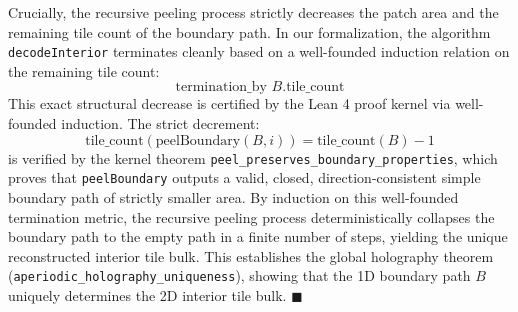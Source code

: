 \documentclass[11pt, a4paper]{amsart}
\begin{document}
Crucially, the recursive peeling process strictly decreases the patch area and the remaining tile count of the boundary path. In our formalization, the algorithm \texttt{decodeInterior} terminates cleanly based on a well-founded induction relation on the remaining tile count:
\begin{equation}
\text{termination\_by } B\text{.tile\_count}
\end{equation}
This exact structural decrease is certified by the Lean 4 proof kernel via well-founded induction. The strict decrement:
\begin{equation}
\text{tile\_count}(\text{peelBoundary}(B, i)) = \text{tile\_count}(B) - 1
\end{equation}
is verified by the kernel theorem \texttt{peel\_preserves\_boundary\_properties}, which proves that \texttt{peelBoundary} outputs a valid, closed, direction-consistent simple boundary path of strictly smaller area. By induction on this well-founded termination metric, the recursive peeling process deterministically collapses the boundary path to the empty path in a finite number of steps, yielding the unique reconstructed interior tile bulk. This establishes the global holography theorem (\texttt{aperiodic\_holography\_uniqueness}), showing that the 1D boundary path $B$ uniquely determines the 2D interior tile bulk. $\blacksquare$
\end{document}
